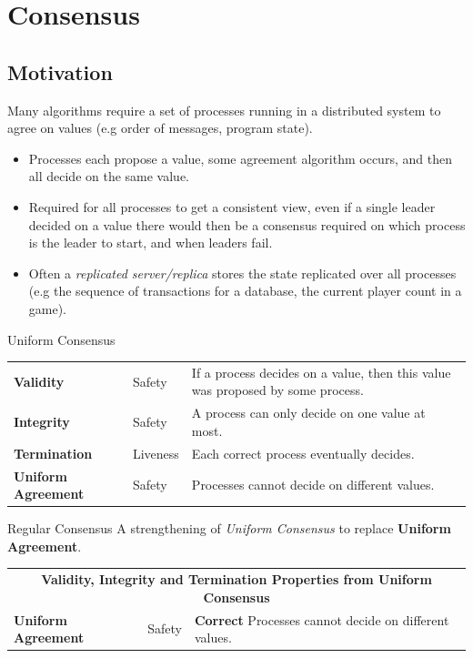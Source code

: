 \chapter{Consensus}
\section{Motivation}
Many algorithms require a set of processes running in a distributed system to agree on values (e.g order of messages, program state).
\begin{itemize}
    \item Processes each propose a value, some agreement algorithm occurs, and then all decide on the same value.
    \item Required for all processes to get a consistent view, even if a single leader decided on a value there would then be a consensus required on which process is the leader to start, and when leaders fail.
    \item Often a \textit{replicated server/replica} stores the state replicated over all processes (e.g the sequence of transactions for a database, the current player count in a game).
\end{itemize}

\begin{definitionbox}{Uniform Consensus}
    \begin{center}
        \begin{tabular}{l l p{}}
            \textbf{Validity}          & Safety   & If a process decides on a value, then this value was proposed by some process. \\
            \textbf{Integrity}         & Safety   & A process can only decide on one value at most.                                \\
            \textbf{Termination}       & Liveness & Each correct process eventually decides.                                       \\
            \textbf{Uniform Agreement} & Safety   & Processes cannot decide on different values.                                   \\
        \end{tabular}
    \end{center}
\end{definitionbox}

\begin{definitionbox}{Regular Consensus}
    A strengthening of \textit{Uniform Consensus} to replace \textbf{Uniform Agreement}.
    \begin{center}
        \begin{tabular}{l l p{}}
            \multicolumn{3}{c}{\textbf{Validity, Integrity and Termination Properties from Uniform Consensus}}  \\
            \textbf{Uniform Agreement} & Safety & \textbf{Correct} Processes cannot decide on different values. \\
        \end{tabular}
    \end{center}
\end{definitionbox}

